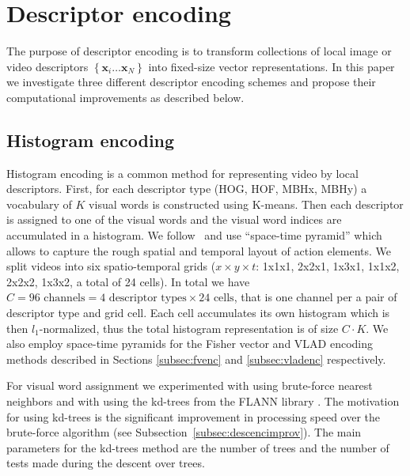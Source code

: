 \documentclass[10pt,twocolumn,letterpaper]{article}
\begin{document}
\section{Descriptor encoding}
\label{sec:quantization}
The purpose of descriptor encoding is to transform collections of local image or video descriptors $\left\{\textbf{x}_i\dots\textbf{x}_N\right\}$ into fixed-size vector representations.
In this paper we investigate three different descriptor encoding schemes and propose their computational improvements as described below.

\subsection{Histogram encoding}
\label{subsec:histenc}
Histogram encoding is a common method for representing video by local descriptors. First, for each descriptor type (HOG, HOF, MBHx, MBHy) a vocabulary of $K$ visual words is constructed using K-means. Then each descriptor is assigned to one of the visual words and the visual word indices are accumulated in a histogram. We follow~\cite{Laptev08} and use ``space-time pyramid'' which allows to capture the rough spatial and temporal layout of action elements. We split videos into six spatio-temporal grids ($x\times y \times t$: 1x1x1, 2x2x1, 1x3x1, 1x1x2, 2x2x2, 1x3x2, a total of 24 cells). In total we have $C=96\text{ channels} = 4 \text{ descriptor types}\times 24\text{ cells}$, that is one channel per a pair of descriptor type and grid cell. Each cell accumulates its own histogram which is then $l_1$-normalized, thus the total histogram representation is of size $C\cdot K$. We also employ space-time pyramids for the Fisher vector and VLAD encoding methods described in Sections \ref{subsec:fvenc} and \ref{subsec:vladenc} respectively.

For visual word assignment we experimented with using brute-force nearest neighbors and with using the kd-trees from the FLANN library \cite{Muja09}. The motivation for using kd-trees is the significant improvement in processing speed over the brute-force algorithm (see Subsection~\ref{subsec:descencimprov}). The main parameters for the kd-trees method are the number of trees and the number of tests  made during the descent over trees. 
\end{document}
